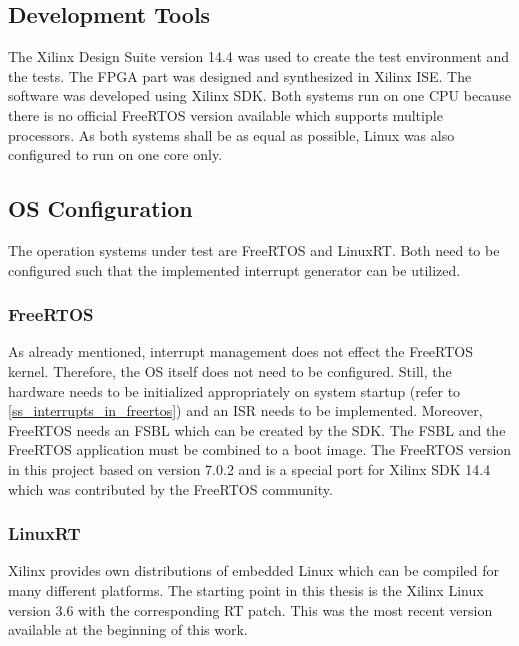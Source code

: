 \subsection{Development Tools}
The Xilinx Design Suite version 14.4 was used to create the test environment and the tests.
The \ac{FPGA} part was designed and synthesized in Xilinx \ac{ISE}.
The software was developed using Xilinx \ac{SDK}.
Both systems run on one \ac{CPU} because there is no official FreeRTOS version available which supports multiple processors.
As both systems shall be as equal as possible, Linux was also configured to run on one core only.

\subsection{\ac{OS} Configuration}
The operation systems under test are FreeRTOS and LinuxRT.
Both need to be configured such that the implemented interrupt generator can be utilized.

\subsubsection{FreeRTOS}
As already mentioned, interrupt management does not effect the FreeRTOS kernel.
Therefore, the \ac{OS} itself does not need to be configured.
Still, the hardware needs to be initialized appropriately on system startup (refer to \ref{ss_interrupts_in_freertos}) and an \ac{ISR} needs to be implemented. 
Moreover, FreeRTOS needs an \ac{FSBL} which can be created by the \ac{SDK}.
The \ac{FSBL} and the FreeRTOS application must be combined to a boot image.
The FreeRTOS version in this project based on version 7.0.2 and is a special port for Xilinx \ac{SDK} 14.4 which was contributed by the FreeRTOS community.

\subsubsection{LinuxRT}\label{sss_linuxrt}
Xilinx provides own distributions of embedded Linux which can be compiled for many different platforms. 
The starting point in this thesis is the Xilinx Linux version 3.6 with the corresponding RT patch.
This was the most recent version available at the beginning of this work.

